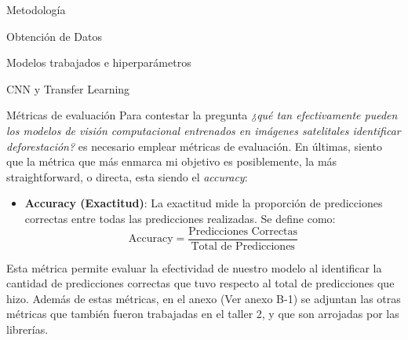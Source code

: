 \documentclass[11pt]{article}
\begin{document}
\begin{section}{Metodología}
\begin{subsection}{Obtención de Datos}
\begin{subsection}{Modelos trabajados e hiperparámetros}
\begin{subsubsection}{CNN y Transfer Learning}
\end{subsubsection}

\begin{subsection}{Métricas de evaluación}
Para contestar la pregunta \textit{¿qué tan efectivamente pueden los modelos de visión computacional entrenados en imágenes satelitales identificar deforestación?} es necesario emplear métricas de evaluación. En últimas, siento que la métrica que más enmarca mi objetivo es posiblemente, la más straightforward, o directa, esta siendo el \textit{accuracy}:

\begin{itemize}
    \item \textbf{Accuracy (Exactitud)}: La exactitud mide la proporción de predicciones correctas entre todas las predicciones realizadas. Se define como:
    \[
    \text{Accuracy} = \frac{\text{Predicciones Correctas}}{\text{Total de Predicciones}}
    \]

\end{itemize}
Esta métrica permite evaluar la efectividad de nuestro modelo al identificar la cantidad de predicciones correctas que tuvo respecto al total de predicciones que hizo. Además de estas métricas, en el anexo (Ver anexo B-1) se adjuntan las otras métricas que también fueron trabajadas en el taller 2, y que son arrojadas por las librerías. 
\end{subsection}

\end{subsection}

\end{subsection}
\end{section}
\end{document}
